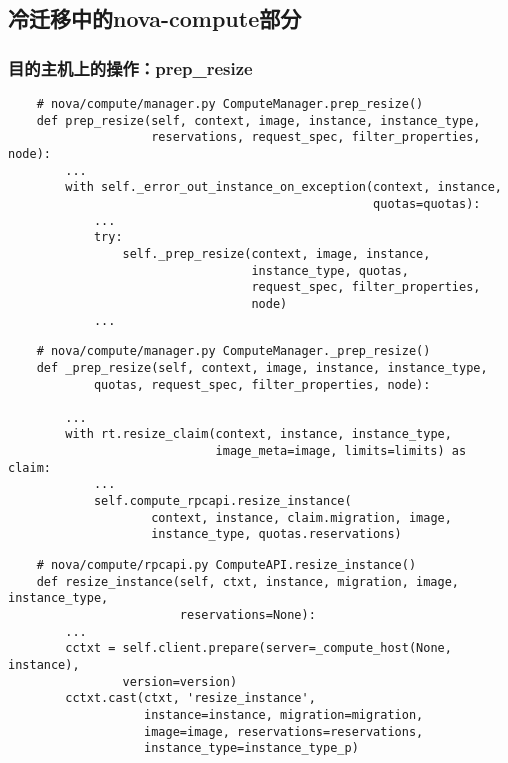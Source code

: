 \documentclass[a4paper,left=1.5cm,right=1.5cm,11pt]{article}
\begin{document}
\subsection{冷迁移中的nova-compute部分}
\subsubsection{目的主机上的操作：prep\_resize}
	\begin{lstlisting}
	# nova/compute/manager.py ComputeManager.prep_resize()
	def prep_resize(self, context, image, instance, instance_type,
                    reservations, request_spec, filter_properties, node):
        ...
        with self._error_out_instance_on_exception(context, instance,
                                                   quotas=quotas):
            ...
            try:
                self._prep_resize(context, image, instance,
                                  instance_type, quotas,
                                  request_spec, filter_properties,
                                  node)
			...
	\end{lstlisting}

	\begin{lstlisting}
	# nova/compute/manager.py ComputeManager._prep_resize()
	def _prep_resize(self, context, image, instance, instance_type,
            quotas, request_spec, filter_properties, node):

        ...
        with rt.resize_claim(context, instance, instance_type,
                             image_meta=image, limits=limits) as claim:
			...
            self.compute_rpcapi.resize_instance(
                    context, instance, claim.migration, image,
                    instance_type, quotas.reservations)
	\end{lstlisting}

	\begin{lstlisting}
	# nova/compute/rpcapi.py ComputeAPI.resize_instance()
	def resize_instance(self, ctxt, instance, migration, image, instance_type,
                        reservations=None):
        ...
        cctxt = self.client.prepare(server=_compute_host(None, instance),
                version=version)
        cctxt.cast(ctxt, 'resize_instance',
                   instance=instance, migration=migration,
                   image=image, reservations=reservations,
                   instance_type=instance_type_p)
	\end{lstlisting}
\end{document}
